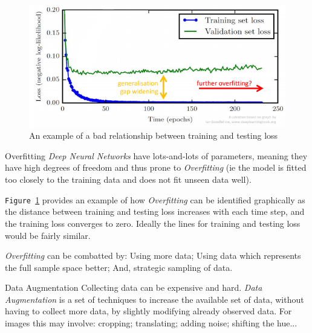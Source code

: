 \documentclass[11pt,a4paper]{article}
\begin{document}
  \begin{figure}[H]
    \centering
    \includegraphics[width=.7\textwidth]{overfitting.PNG}
    \caption{An example of a bad relationship between training and testing loss}
    \label{fig:Overfitting}
  \end{figure}

  \begin{proposition}{Overfitting}
    \textit{Deep Neural Networks} have lots-and-lots of parameters, meaning they have high degrees of freedom and thus prone to \textit{Overfitting} (ie the model is fitted too closely to the training data and does not fit unseen data well).
    \par \texttt{Figure \ref{fig:Overfitting}} provides an example of how \textit{Overfitting} can be identified graphically as the distance between training and testing loss increases with each time step, and the training loss converges to zero. Ideally the lines for training and testing loss would be fairly similar.
    \par \textit{Overfitting} can be combatted by: Using more data; Using data which represents the full sample space better; And, strategic sampling of data.
  \end{proposition}

  \begin{definition}{Data Augmentation}
    Collecting data can be expensive and hard. \textit{Data Augmentation} is a set of techniques to increase the available set of data, without having to collect more data, by slightly modifying already observed data. For images this may involve: cropping; translating; adding noise; shifting the hue...
  \end{definition}
\end{document}
